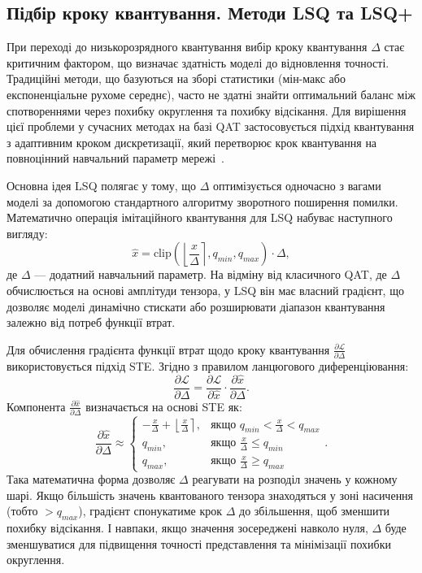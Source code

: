 \documentclass{pma-mthesis}
\begin{document}
\subsection{Підбір кроку квантування. Методи LSQ та LSQ+}

При переході до низькорозрядного квантування вибір кроку квантування $\Delta$ стає критичним фактором, що визначає здатність моделі до відновлення точності. Традиційні методи, що базуються на зборі статистики (мін-макс або експоненціальне рухоме середнє), часто не здатні знайти оптимальний баланс між спотвореннями через похибку округлення та похибку відсікання. Для вирішення цієї проблеми у сучасних методах на базі QAT застосовується підхід квантування з адаптивним кроком дискретизації, який перетворює крок квантування на повноцінний навчальний параметр мережі~\cite{Esser2020LSQ}.

Основна ідея LSQ полягає у тому, що $\Delta$ оптимізується одночасно з вагами моделі за допомогою стандартного алгоритму зворотного поширення помилки. Математично операція імітаційного квантування для LSQ набуває наступного вигляду:
\begin{equation}
    \hat{x} = \text{clip} \left( \left\lfloor \frac{x}{\Delta} \right\rceil, q_{min}, q_{max} \right) \cdot \Delta,
\end{equation}
де $\Delta$ --- додатний навчальний параметр. На відміну від класичного QAT, де $\Delta$ обчислюється на основі амплітуди тензора, у LSQ він має власний градієнт, що дозволяє моделі динамічно стискати або розширювати діапазон квантування залежно від потреб функції втрат.

Для обчислення градієнта функції втрат щодо кроку квантування $\frac{\partial \mathcal{L}}{\partial \Delta}$ використовується підхід STE. Згідно з правилом ланцюгового диференціювання:
\begin{equation}
    \frac{\partial \mathcal{L}}{\partial \Delta} = \frac{\partial \mathcal{L}}{\partial \hat{x}} \cdot \frac{\partial \hat{x}}{\partial \Delta}.
\end{equation}
Компонента $\frac{\partial \hat{x}}{\partial \Delta}$ визначається на основі STE як:
\begin{equation}
    \frac{\partial \hat{x}}{\partial \Delta} \approx \begin{cases}
    -\frac{x}{\Delta} + \left\lfloor \frac{x}{\Delta} \right\rceil, & \text{якщо } q_{min} < \frac{x}{\Delta} < q_{max} \\
    q_{min}, & \text{якщо } \frac{x}{\Delta} \leq q_{min} \\
    q_{max}, & \text{якщо } \frac{x}{\Delta} \geq q_{max}
    \end{cases}.
\end{equation}
Така математична форма дозволяє $\Delta$ реагувати на розподіл значень у кожному шарі. Якщо більшість значень квантованого тензора знаходяться у зоні насичення (тобто $ > q_{max}$), градієнт спонукатиме крок $\Delta$ до збільшення, щоб зменшити похибку відсікання. І навпаки, якщо значення зосереджені навколо нуля, $\Delta$ буде зменшуватися для підвищення точності представлення та мінімізації похибки округлення.
\end{document}
